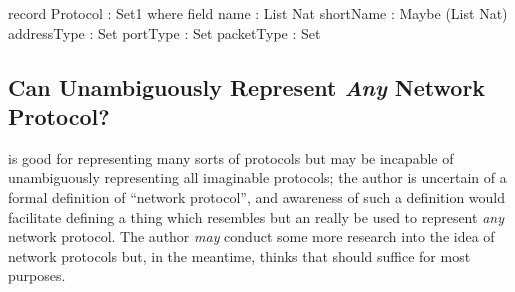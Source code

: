 \documentclass{article}
\begin{document}
\begin{code}
record Protocol : Set1 where
  field
    name : List Nat
    shortName : Maybe (List Nat)
    addressType : Set
    portType : Set
    packetType : Set
\end{code}

\subsection{Can  Unambiguously Represent \emph{Any} Network Protocol?}
 is good for representing many sorts of protocols but may be incapable of unambiguously representing all imaginable protocols; the author is uncertain of a formal definition of ``network protocol'', and awareness of such a definition would facilitate defining a thing which resembles  but an really be used to represent \emph{any} network protocol.  The author \emph{may} conduct some more research into the idea of network protocols but, in the meantime, thinks that  should suffice for most purposes.
\end{document}
